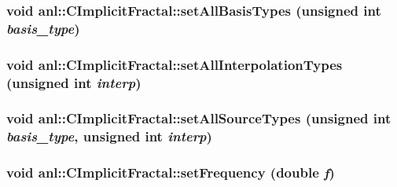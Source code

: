 \label{classanl_1_1CImplicitFractal_ab27066fe7b659cbbb50947f7c668cb77}
\hypertarget{classanl_1_1CImplicitFractal_a0179d7428b6ee61a87cdd2ffa012d5cc}{
\subsubsection[{setAllBasisTypes}]{\setlength{\rightskip}{0pt plus 5cm}void anl::CImplicitFractal::setAllBasisTypes (unsigned int {\em basis\_\-type})}}
\label{classanl_1_1CImplicitFractal_a0179d7428b6ee61a87cdd2ffa012d5cc}
\hypertarget{classanl_1_1CImplicitFractal_a1c3c79a50223078d20f88aa31a99c8cc}{
\subsubsection[{setAllInterpolationTypes}]{\setlength{\rightskip}{0pt plus 5cm}void anl::CImplicitFractal::setAllInterpolationTypes (unsigned int {\em interp})}}
\label{classanl_1_1CImplicitFractal_a1c3c79a50223078d20f88aa31a99c8cc}
\hypertarget{classanl_1_1CImplicitFractal_a10de2f1eb07f25e45276891e04b1a153}{
\subsubsection[{setAllSourceTypes}]{\setlength{\rightskip}{0pt plus 5cm}void anl::CImplicitFractal::setAllSourceTypes (unsigned int {\em basis\_\-type}, \/  unsigned int {\em interp})}}
\label{classanl_1_1CImplicitFractal_a10de2f1eb07f25e45276891e04b1a153}
\hypertarget{classanl_1_1CImplicitFractal_a43e02702d75a1a182b5aad7570cbb402}{
\subsubsection[{setFrequency}]{\setlength{\rightskip}{0pt plus 5cm}void anl::CImplicitFractal::setFrequency (double {\em f})}}
